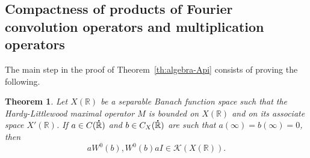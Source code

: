\documentclass[reqno]{amsproc}
\newcommand{\dR}{{\bf\dot{\R}}}
\newcommand{\R}{\mathbb{R}}
\newtheorem{theorem}{Theorem}[section]
\theoremstyle{definition}
\theoremstyle{remark}
\numberwithin{equation}{section}
\begin{document}
\subsection{Compactness of products of Fourier convolution
operators and multiplication operators}
The main step in the proof of Theorem~\ref{th:algebra-Api} consists
of proving the following. 
\begin{theorem}\label{th:compactness-products}
Let $X(\R)$ be a separable Banach function space such that the Hardy-Littlewood 
maximal operator $M$ is bounded on  $X(\R)$ and on its associate 
space $X'(\R)$. If $a \in C(\dR)$ and $b \in C_X(\dR)$ are such 
that $a(\infty)= b(\infty)=0$, then 
\[
aW^0(b), W^0(b)aI \in \mathcal{K}(X(\mathbb{R})).
\]
\end{theorem}
\end{document}
